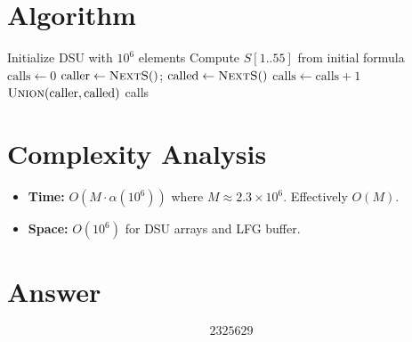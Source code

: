 \documentclass[12pt]{article}
\begin{document}
\section{Algorithm}

\begin{algorithmic}[1]
    \State Initialize DSU with $10^6$ elements
    \State Compute $S[1..55]$ from initial formula
    \State $\mathrm{calls} \gets 0$
        \State $\mathrm{caller} \gets \textsc{NextS}()$; $\mathrm{called} \gets \textsc{NextS}()$
            \State $\mathrm{calls} \gets \mathrm{calls} + 1$
            \State $\textsc{Union}(\mathrm{caller}, \mathrm{called})$
        \EndIf
    \EndWhile
    \State \Return calls
\EndFunction
\end{algorithmic}

\section{Complexity Analysis}

\begin{itemize}
    \item \textbf{Time:} $O(M \cdot \alpha(10^6))$ where $M \approx 2.3 \times 10^6$. Effectively $O(M)$.
    \item \textbf{Space:} $O(10^6)$ for DSU arrays and LFG buffer.
\end{itemize}

\section{Answer}

\[
\boxed{2325629}
\]
\end{document}
